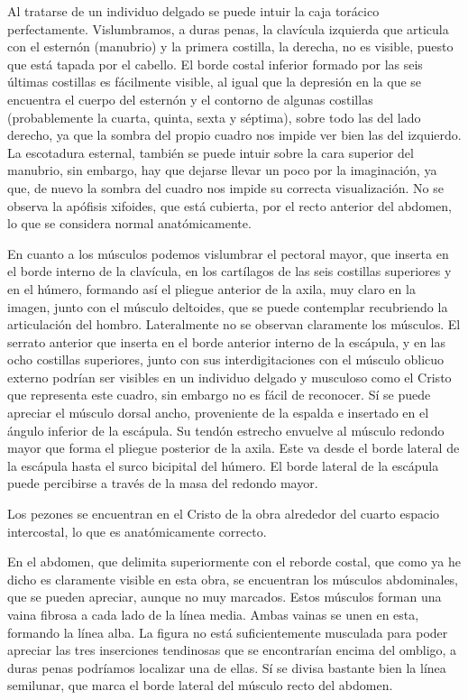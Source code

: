 Al tratarse de un individuo delgado se puede intuir la caja torácico perfectamente. Vislumbramos, a duras penas, la clavícula izquierda que articula con el esternón (manubrio) y la primera costilla, la derecha, no es visible, puesto que está tapada por el cabello. El borde costal inferior formado por las seis últimas costillas es fácilmente visible, al igual que la depresión en la que se encuentra el cuerpo del esternón y el contorno de algunas costillas (probablemente la cuarta, quinta, sexta y séptima), sobre todo las del lado derecho, ya que la sombra del propio cuadro nos  impide ver bien las del izquierdo. La escotadura esternal, también se puede intuir sobre la cara superior del manubrio, sin embargo, hay que dejarse llevar un poco por la imaginación, ya que, de nuevo la sombra del cuadro nos impide su correcta visualización. No se observa la apófisis xifoides, que está cubierta, por el recto anterior del abdomen, lo que se considera normal anatómicamente.

En cuanto a los músculos podemos vislumbrar el pectoral mayor, que inserta en el borde interno de la clavícula, en los cartílagos de las seis costillas superiores y en el húmero, formando así el pliegue anterior de la axila, muy claro en la imagen, junto con el músculo deltoides, que se puede contemplar recubriendo la articulación del hombro. Lateralmente no se observan claramente los músculos. El serrato anterior que inserta en el borde anterior interno de la escápula, y en las ocho costillas superiores, junto con sus interdigitaciones con el músculo oblicuo externo podrían ser visibles en un individuo delgado y musculoso como el Cristo que representa este cuadro, sin embargo no es fácil de reconocer. Sí se puede apreciar el músculo dorsal ancho, proveniente de la espalda e insertado en el ángulo inferior de la escápula. Su tendón estrecho envuelve al músculo redondo mayor que forma el pliegue posterior de la axila. Este va desde el borde lateral de la escápula hasta el surco bicipital del húmero. El borde lateral de la escápula puede percibirse a través de la masa del redondo mayor.

Los pezones se encuentran en el Cristo de la obra alrededor del cuarto espacio intercostal, lo que es anatómicamente correcto.

\vspace{12pt}

En el abdomen, que delimita superiormente con el reborde costal, que como ya he dicho es claramente visible en esta obra, se encuentran los músculos abdominales, que se pueden apreciar, aunque no muy marcados. Estos músculos forman una vaina fibrosa a cada lado de la línea media. Ambas vainas se unen en esta, formando la línea alba. La figura no está suficientemente musculada para poder apreciar las tres inserciones tendinosas que se encontrarían encima del ombligo, a duras penas podríamos localizar una de ellas. Sí se divisa bastante bien la línea semilunar, que marca el borde lateral del músculo recto del abdomen.

